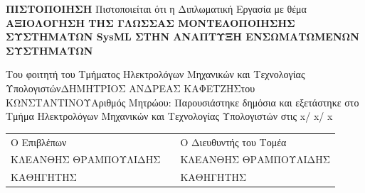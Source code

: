 \documentclass[a4paper,12pt,twoside]{report}
\newcommand{ \FirstName}{ΔΗΜΗΤΡΙΟΣ ΑΝΔΡΕΑΣ }
\newcommand{ \LastName}{ΚΑΦΕΤΖΗΣ}
\newcommand{ \FathersName}{ΚΩΝΣΤΑΝΤΙΝΟΥ}
\newcommand{ \AM}{5657}
\newcommand{ \ThesisTitle}{ΑΞΙΟΛΟΓΗΣΗ ΤΗΣ ΓΛΩΣΣΑΣ ΜΟΝΤΕΛΟΠΟΙΗΣΗΣ ΣΥΣΤΗΜΑΤΩΝ SysML ΣΤΗΝ ΑΝΑΠΤΥΞΗ ΕΝΣΩΜΑΤΩΜΕΝΩΝ ΣΥΣΤΗΜΑΤΩΝ}
\newcommand{ \FirstProfessor}{ΚΛΕΑΝΘΗΣ ΘΡΑΜΠΟΥΛΙΔΗΣ}
\newcommand{ \FirstProfessorsRank}{ΚΑΘΗΓΗΤΗΣ}
\newcommand{ \SecondProfessor}{ΚΛΕΑΝΘΗΣ ΘΡΑΜΠΟΥΛΙΔΗΣ}
\newcommand{ \SecondProfessorsRank}{ΚΑΘΗΓΗΤΗΣ}
\newcommand{ \ExaminationDay}{x}
\newcommand{ \ExaminationMonth}{x}
\newcommand{ \ExaminationYear}{x}
\begin{document}
	{\label{Δεύτερη σελίδα} 
		\newpage
		\begin{center}
			\textbf{{\LARGE ΠΙΣΤΟΠΟΙΗΣΗ}}\linebreak \linebreak
			{\large Πιστοποιείται ότι η Διπλωματική Εργασία με θέμα}\linebreak \linebreak
			{\Large \textbf{ \ThesisTitle}}\linebreak\linebreak\linebreak
			\begin{large}
				Του φοιτητή του Τμήματος Ηλεκτρολόγων Μηχανικών και Τεχνολογίας Υπολογιστών\linebreak \linebreak \linebreak \FirstName \LastName  του \FathersName\linebreak \linebreak Αριθμός Μητρώου:  \linebreak \AM \linebreak \linebreak \linebreak Παρουσιάστηκε δημόσια και εξετάστηκε στο Τμήμα Ηλεκτρολόγων Μηχανικών και Τεχνολογίας Υπολογιστών στις \linebreak \ExaminationDay / \ExaminationMonth / \ExaminationYear \linebreak
			\end{large}
		\end{center}
		\vspace{3cm}
		\begin{large}
			\begin{tabular}{m{5cm} m{1cm} m{6cm}}
			Ο Επιβλέπων & & Ο Διευθυντής του Τομέα\\
			\FirstProfessor & & \SecondProfessor \\
			\FirstProfessorsRank & & \SecondProfessorsRank
			\end{tabular}
		\end{large}
	}
		
\end{document}
